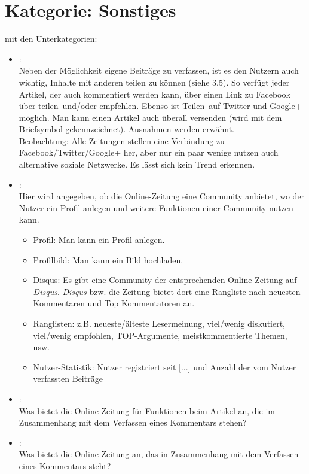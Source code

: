 \section{Kategorie: \glqq Sonstiges\grqq} 

mit den Unterkategorien:
\begin{itemize}[noitemsep]
  \item{}\grqq:\\
    Neben der Möglichkeit eigene Beiträge zu verfassen, ist es den Nutzern auch
    wichtig, Inhalte mit anderen teilen zu können (siehe 3.5). So verfügt jeder
    Artikel, der auch kommentiert werden kann, über einen Link zu Facebook über
    \glqq teilen\grqq\ und/oder \glqq empfehlen\grqq.  Ebenso ist \glqq
    Teilen\grqq\ auf Twitter und Google+ möglich. Man kann einen Artikel auch
    überall versenden (wird mit dem Briefsymbol gekennzeichnet). Ausnahmen
    werden erwähnt.\\
    Beobachtung: Alle Zeitungen stellen eine Verbindung zu Facebook/Twitter/Google+
    her, aber nur ein paar wenige nutzen auch alternative soziale Netzwerke. Es lässt 
    sich kein Trend erkennen. 

  \item{}\grqq:\\
    Hier wird angegeben, ob die Online-Zeitung eine Community anbietet, wo der
    Nutzer ein Profil anlegen und weitere Funktionen einer Community nutzen
    kann.
    \begin{itemize}[noitemsep]
      \item Profil: Man kann ein Profil anlegen.
      \item Profilbild: Man kann ein Bild hochladen.
      \item Disqus: Es gibt eine Community der entsprechenden Online-Zeitung auf
        {\slshape Disqus}. {\slshape Disqus} bzw.  die Zeitung bietet dort eine Rangliste nach \glqq
        neuesten Kommentaren\grqq{} und  \glqq Top Kommentatoren\grqq{} an.
      \item Ranglisten: z.B. neueste/älteste Lesermeinung, viel/\-we\-nig
        diskutiert, viel/we\-nig empfohlen, TOP-Argumente, meistkommentierte
        Themen, usw.
      \item Nutzer-Statistik: Nutzer registriert seit [...] und
        Anzahl der vom Nutzer verfassten Beiträge
    \end{itemize}

  \item{}\grqq:\\
    Was bietet die Online-Zeitung für Funktionen beim Artikel an, die im
    Zusammenhang mit dem Verfassen eines Kommentars stehen?

  \item{}\grqq:\\
    Was bietet die Online-Zeitung an, das in Zusammenhang mit dem Verfassen
    eines Kommentars steht?
\end{itemize}


